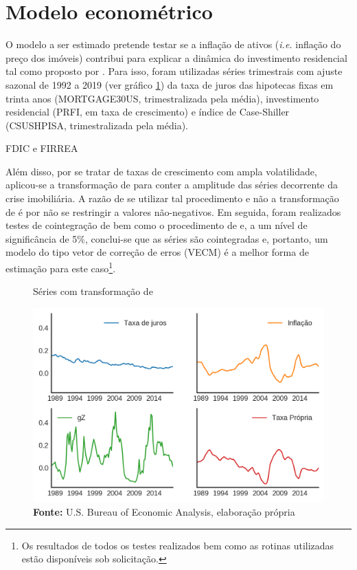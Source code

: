 \section{Modelo econométrico}
\label{Modelo_empirico}

O modelo a ser estimado pretende testar se a inflação de ativos (\textit{i.e.} inflação do preço dos imóveis) contribui para explicar a dinâmica do investimento residencial tal como proposto por \textcite{teixeira_crescimento_2015}. 
Para isso, foram utilizadas séries trimestrais com ajuste sazonal de 1992 a 2019 (ver gráfico \ref{YeoJhonson}) da taxa de juros das hipotecas fixas em trinta anos (MORTGAGE30US, trimestralizada pela média), investimento residencial (PRFI, em taxa de crescimento) e índice de Case-Shiller (CSUSHPISA, trimestralizada pela média).

FDIC e FIRREA


Além disso, por se tratar de taxas de crescimento com ampla volatilidade, aplicou-se a transformação de \textcite{yeo_new_2000} para conter a amplitude das séries decorrente da crise imobiliária. A razão de se utilizar tal procedimento e não a transformação de \textcite{box_analysis_1964} é por não se restringir a valores não-negativos. Em seguida, foram realizados testes de cointegração de \textcite{engle_co-integration_1987} bem como o procedimento de \textcite{johansen_estimation_1991} e, a um nível de significância de 5\%, conclui-se que as séries são cointegradas e, portanto, um modelo do tipo vetor de correção de erros (VECM) é a melhor forma de estimação para este caso\footnote{Os resultados de todos os testes realizados bem como as rotinas utilizadas estão disponíveis sob solicitação.}.

\begin{figure}[H]
	\centering
	\caption{Séries com transformação de \textcite{yeo_new_2000}}
	\label{YeoJhonson}
	\includegraphics[width=\textwidth]{Fatos_Estilizados/Figs/YeoJohnson.png}
	\caption*{\textbf{Fonte:} U.S. Bureau of Economic Analysis, elaboração própria}
\end{figure}


